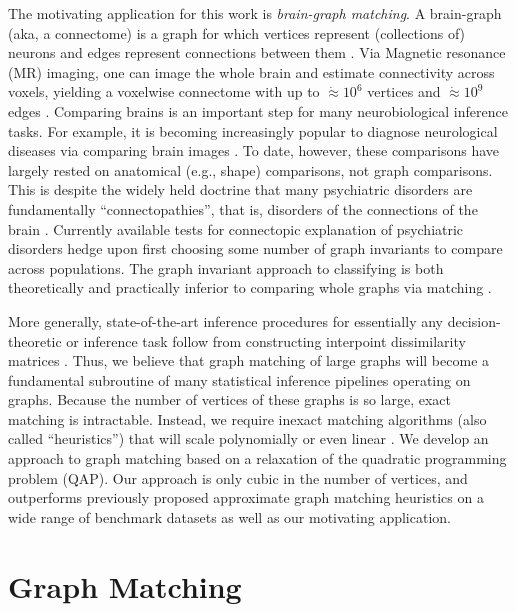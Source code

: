 \documentclass[10pt,journal,cspaper,compsoc]{IEEEtran}
\begin{document}
The motivating application for this work is \emph{brain-graph matching}.  A brain-graph (aka, a connectome) is a graph for which vertices represent (collections of) neurons and edges represent connections between them \cite{SpornsKotter05, Hagmann05}. Via  Magnetic resonance (MR) imaging, one can image the whole brain and estimate connectivity across voxels, yielding a voxelwise connectome with up to $\dot{\approx} 10^6$ vertices and $\dot{\approx} 10^9$ edges \cite{Zuo2011}.  Comparing brains is an important step for many neurobiological inference tasks.  For example, it is becoming increasingly popular to diagnose neurological diseases via comparing brain images \cite{Csernansky2004}.  To date, however, these comparisons have largely rested on anatomical (e.g., shape) comparisons, not graph comparisons.  This is despite the widely held doctrine that many
psychiatric disorders are fundamentally ``connectopathies'', that is, disorders of the connections of the brain \cite{Kubicki2007,Calhoun2011,Fornito2012,Fornito2012a}. Currently available tests for connectopic explanation of psychiatric disorders  hedge upon first choosing some number of graph invariants to compare across populations. The graph invariant approach to classifying is both theoretically and practically inferior to comparing whole graphs via matching \cite{VP11_unlabeled}.  

More generally, state-of-the-art inference procedures for essentially any decision-theoretic or inference task follow from constructing interpoint dissimilarity matrices \cite{Duin2011}.  Thus, we believe that graph matching of large graphs will become a fundamental subroutine of many statistical inference pipelines operating on graphs. Because the number of vertices of these graphs is so large, exact matching is intractable.   Instead, we require inexact matching algorithms (also called ``heuristics'') that will scale polynomially or even linear \cite{Conte2004}.  We develop an approach to graph matching based on a relaxation of the quadratic programming problem (QAP).  Our approach is only cubic in the number of vertices, and outperforms previously proposed approximate graph matching heuristics on a wide range of benchmark datasets as well as our motivating application.  




\section{Graph Matching} %
\label{sec:graph_matching}
\end{document}
